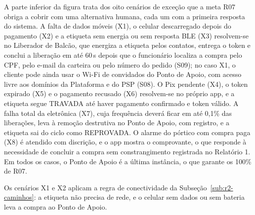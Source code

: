 A parte inferior da figura trata dos oito cenários de exceção que a meta R07 obriga a cobrir com uma alternativa humana, cada um com a primeira resposta do sistema. A falta de dados móveis (X1), o celular descarregado depois do pagamento (X2) e a etiqueta sem energia ou sem resposta BLE (X3) resolvem-se no Liberador de Balcão, que energiza a etiqueta pelos contatos, entrega o token e conclui a liberação em até 60\,s depois que o funcionário localiza a compra pelo CPF, pelo e-mail da carteira ou pelo número do pedido (S09); no caso X1, o cliente pode ainda usar o Wi-Fi de convidados do Ponto de Apoio, com acesso livre aos domínios da Plataforma e do PSP (S08). O Pix pendente (X4), o token expirado (X5) e o pagamento recusado (X6) resolvem-se no próprio app, e a etiqueta segue TRAVADA até haver pagamento confirmado e token válido. A falha total da eletrônica (X7), cuja frequência deverá ficar em até 0,1\% das liberações, leva à remoção destrutiva no Ponto de Apoio, com registro, e a etiqueta sai do ciclo como REPROVADA. O alarme do pórtico com compra paga (X8) é atendido com discrição, e o app mostra o comprovante, o que responde à necessidade de concluir a compra sem constrangimento registrada no Relatório 1. Em todos os casos, o Ponto de Apoio é a última instância, o que garante os 100\% de R07.

Os cenários X1 e X2 aplicam a regra de conectividade da Subseção~\ref{sub:r2-caminhos}: a etiqueta não precisa de rede, e o celular sem dados ou sem bateria leva a compra ao Ponto de Apoio.

